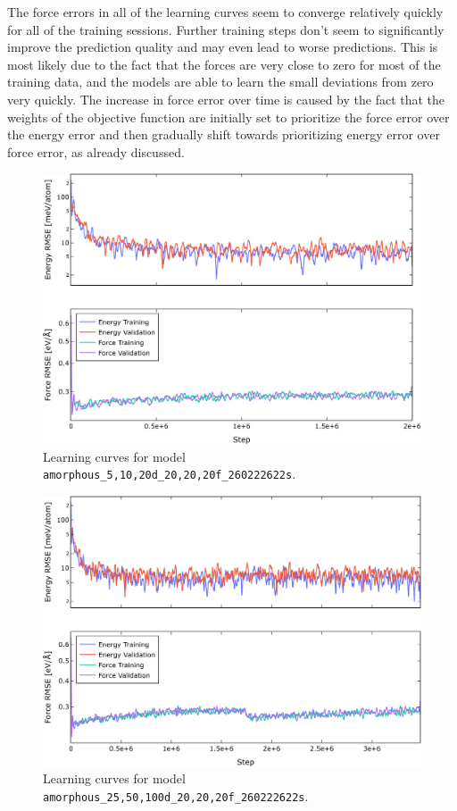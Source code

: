 The force errors in all of the learning curves seem to converge relatively
quickly for all of the training sessions. Further training steps don't seem to
significantly improve the prediction quality and may even lead to worse
predictions. This is most likely due to the fact that the forces are very
close to zero for most of the training data, and the models are able to learn
the small deviations from zero very quickly. The increase in force error over
time is caused by the fact that the weights of the objective function are
initially set to prioritize the force error over the energy error and then
gradually shift towards prioritizing energy error over force error, as already
discussed.

\begin{figure}
  \begin{center}
    \includegraphics[width=.8\textwidth]{
      asset/amorphous_5,10,20d_20,20,20f_260222622s_energy_force_l_curve.jpg
    }
  \end{center}
  \caption{Learning curves for model \texttt{amorphous\_5,10,20d\_20,20,20f\_260222622s}.}
  \label{fig:amorphous_5,10,20d_20,20,20f_260222622s-learning-curves}
\end{figure}

\begin{figure}
  \begin{center}
    \includegraphics[width=.8\textwidth]{
      asset/amorphous_25,50,100d_20,20,20f_260222622s_energy_force_l_curve.jpg
    }
  \end{center}
  \caption{Learning curves for model \texttt{amorphous\_25,50,100d\_20,20,20f\_260222622s}.}
  \label{fig:amorphous_25,50,100d_20,20,20f_260222622s-learning-curves}
\end{figure}


